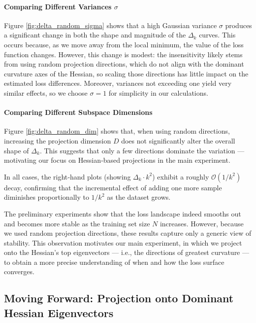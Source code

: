 \documentclass{article}
\begin{document}
\paragraph{Comparing Different Variances \texorpdfstring{$\sigma$}{sigma}}
Figure \ref{fig:delta_random_sigma} shows that a high Gaussian variance $\sigma$ produces a significant change in both the shape
and magnitude of the $\Delta_k$ curves. This occurs because, as we move away from the local minimum, the value of the loss
function changes. However, this change is modest: the insensitivity likely stems from using random projection directions,
which do not align with the dominant curvature axes of the Hessian, so scaling those directions has little impact on the estimated
loss differences. Moreover, variances not exceeding one yield very similar effects, so we choose $\sigma = 1$ for simplicity in our
calculations.

\paragraph{Comparing Different Subspace Dimensions}
Figure \ref{fig:delta_random_dim} shows that, when using random directions, increasing the projection dimension $D$ does not
significantly alter the overall shape of $\Delta_k$. This suggests that only a few directions dominate the variation --- motivating our
focus on Hessian‐based projections in the main experiment.

In all cases, the right‐hand plots (showing $\Delta_k \cdot k^2$) exhibit a roughly $\mathcal O(1 / k^2)$ decay, confirming that the
incremental effect of adding one more sample diminishes proportionally to $1 / k^2$ as the dataset grows.

The preliminary experiments show that the loss landscape indeed smooths out and becomes more stable as the training set size $N$
increases. However, because we used random projection directions, these results capture only a generic view of stability. This
observation motivates our main experiment, in which we project onto the Hessian’s top eigenvectors --- i.e., the directions of greatest
curvature --- to obtain a more precise understanding of when and how the loss surface converges.

\subsection{Moving Forward: Projection onto Dominant Hessian Eigenvectors}\label{sec:exp:hes}
\end{document}
